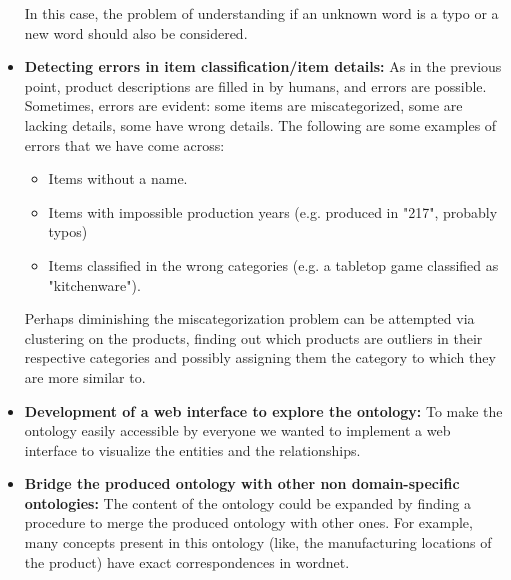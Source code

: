 \documentclass[LaM,oneside,binding=0.6cm]{sapthesis}
\begin{document}
\begin{itemize}
	In this case, the problem of understanding if an unknown word is a typo or a new word should also be considered.
	\item \textbf{Detecting errors in item classification/item details: } As in the previous point, product descriptions are filled in by humans, and errors are possible. Sometimes, errors are evident: some items are miscategorized, some are lacking details, some have wrong details. The following are some examples of errors that we have come across:
	\begin{itemize}
		\item Items without a name. 
		\item Items with impossible production years (e.g. produced in "217", probably typos)
		\item Items classified in the wrong categories (e.g. a tabletop game classified as "kitchenware").
	\end{itemize}
	Perhaps diminishing the miscategorization problem can be attempted via clustering on the products, finding out which products are outliers in their respective categories and possibly assigning them the category to which they are more similar to.
	\item \textbf{Development of a web interface to explore the ontology: } To make the ontology easily accessible by everyone we wanted to implement a web interface to visualize the entities and the relationships.
	\item \textbf{Bridge the produced ontology with other non domain-specific ontologies: } The content of the ontology could be expanded by finding a procedure to merge the produced ontology with other ones. For example, many concepts present in this ontology (like, the manufacturing locations of the product) have exact correspondences in wordnet. 
\end{itemize}





\backmatter
\cleardoublepage
{}
\printbibliography
\end{document}
